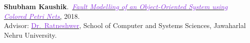 \textbf{Shubham Kaushik}.\ \href{https://doi.org/10.26438/ijcse/v7i5.18281845}
{\textit{\textcolor{blueviolet}{Fault Modelling of an Object-Oriented System using Colored Petri Nets},}} 2018.\\
Advisor:
\href{https://www.jnu.ac.in/content/ratnesh}{\textcolor{blueviolet}{Dr.\
		Ratneshwer}}, School of Computer and Systems Sciences, Jawaharlal Nehru
University.